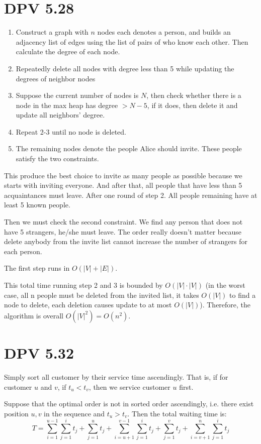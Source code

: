 \documentclass[twoside]{homework}
\begin{document}
\section{DPV 5.28}
\begin{enumerate}
	\item Construct a graph with $n$ nodes each denotes a person, and builds an adjacency list of edges using the list of pairs of who know each other. Then calculate the degree of each node.
	\item Repeatedly delete all nodes with degree less than 5 while updating the degrees of neighbor nodes
	\item Suppose the current number of nodes is $N$, then check whether there is a node in the max heap has degree $> N - 5$, if it does, then delete it and update all neighbors' degree.
	\item Repeat 2-3 until no node is deleted.
	\item The remaining nodes denote the people Alice should invite. These people satisfy the two constraints.
\end{enumerate}

This produce the best choice to invite as many people as possible because we starts with inviting everyone. And after that, all people that have less than 5 acquaintances must leave. After one round of step 2. All people remaining have at least 5 known people.

Then we must check the second constraint. We find any person that does not have 5 strangers, he/she must leave. The order really doesn't matter because delete anybody from the invite list cannot increase the number of strangers for each person.


The first step runs in $O(|V|+|E|)$.

This total time running step 2 and 3 is bounded by $O(|V|\cdot|V|)$ (in the worst case, all n people must be deleted from the invited list, it takes $O(|V|)$ to find a node to delete, each deletion causes update to at most $O(|V|)$). Therefore, the algorithm is overall $O(|V|^2) = O(n^2)$.


\section{DPV 5.32}
Simply sort all customer by their service time ascendingly. That is, if for customer $u$ and $v$, if $t_u < t_v$, then we service customer $u$ first.

Suppose that the optimal order is not in sorted order ascendingly, i.e. there exist position $u, v$ in the sequence and $t_u > t_v$. Then the total waiting time is:
\[ T = \sum_{i=1}^{u-1}\sum_{j=1}^i t_j + \sum_{j=1}^u t_j + \sum_{i=u+1}^{v-1}\sum_{j=1}^i t_j + \sum_{j=1}^v t_j + \sum_{i=v+1}^n\sum_{j=1}^i t_j\]
\end{document}
